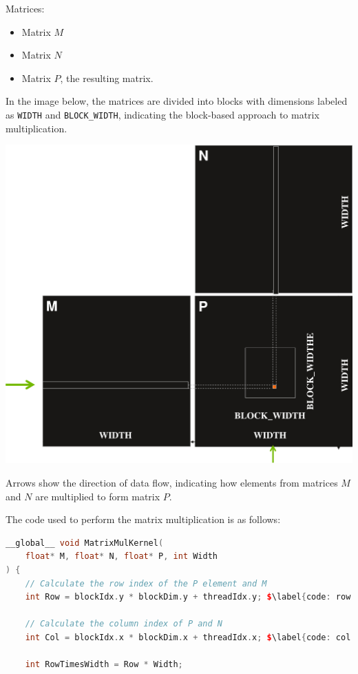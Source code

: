 \begin{examplebox}\label{examplebox: CUDA Matrix Multiplication}
    Matrices:
    \begin{itemize}
        \item Matrix $M$
        \item Matrix $N$
        \item Matrix $P$, the resulting matrix.
    \end{itemize}
    In the image below, the matrices are divided into blocks with dimensions labeled as \texttt{WIDTH} and \texttt{BLOCK\_WIDTH}, indicating the block-based approach to matrix multiplication.
    \begin{center}
        \includegraphics[width=.8\textwidth]{img/cuda-matrix-multiplication-1.pdf}
    \end{center}
    
    Arrows show the direction of data flow, indicating how elements from matrices $M$ and $N$ are multiplied to form matrix $P$.

    The code used to perform the matrix multiplication is as follows:
    \begin{lstlisting}[language=C++]
__global__ void MatrixMulKernel(
    float* M, float* N, float* P, int Width
) {
    // Calculate the row index of the P element and M
    int Row = blockIdx.y * blockDim.y + threadIdx.y; $\label{code: row index}$

    // Calculate the column index of P and N
    int Col = blockIdx.x * blockDim.x + threadIdx.x; $\label{code: col index}$

    int RowTimesWidth = Row * Width;


\end{lstlisting}
\end{examplebox}
